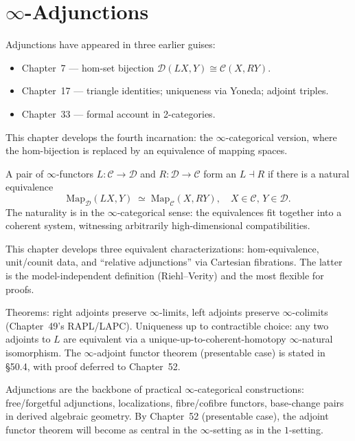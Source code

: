 
\chapter{$\infty$-Adjunctions}

\begin{overviewbox}
Adjunctions have appeared in three earlier guises:
\begin{itemize}
  \item Chapter~7 — hom-set bijection $\mathcal{D}(LX, Y) \cong \mathcal{C}(X, RY)$.
  \item Chapter~17 — triangle identities; uniqueness via Yoneda; adjoint triples.
  \item Chapter~33 — formal account in 2-categories.
\end{itemize}
This chapter develops the fourth incarnation: the $\infty$-categorical
version, where the hom-bijection is replaced by an equivalence of
mapping spaces.

A pair of $\infty$-functors $L : \mathcal{C} \to \mathcal{D}$ and
$R : \mathcal{D} \to \mathcal{C}$ form an 
$L \dashv R$ if there is a natural equivalence
\begin{equation*}
  \mathrm{Map}_\mathcal{D}(L X, Y) \;\simeq\; \mathrm{Map}_\mathcal{C}(X, R Y),
  \quad X \in \mathcal{C}, \, Y \in \mathcal{D}.
\end{equation*}
The naturality is in the $\infty$-categorical sense: the equivalences fit
together into a coherent system, witnessing arbitrarily high-dimensional
compatibilities.

This chapter develops three equivalent characterizations: hom-equivalence,
unit/counit data, and ``relative adjunctions'' via Cartesian fibrations.
The latter is the model-independent definition (Riehl–Verity) and the
most flexible for proofs.

Theorems: right adjoints preserve $\infty$-limits, left adjoints preserve
$\infty$-colimits (Chapter~49's RAPL/LAPC). Uniqueness up to contractible
choice: any two adjoints to $L$ are equivalent via a unique-up-to-coherent-homotopy
$\infty$-natural isomorphism. The $\infty$-adjoint functor theorem
(presentable case) is stated in §50.4, with proof deferred to Chapter~52.

Adjunctions are the backbone of practical $\infty$-categorical
constructions: free/forgetful adjunctions, localizations, fibre/cofibre
functors, base-change pairs in derived algebraic geometry. By Chapter~52
(presentable case), the adjoint functor theorem will become as central in
the $\infty$-setting as in the $1$-setting.
\end{overviewbox}


